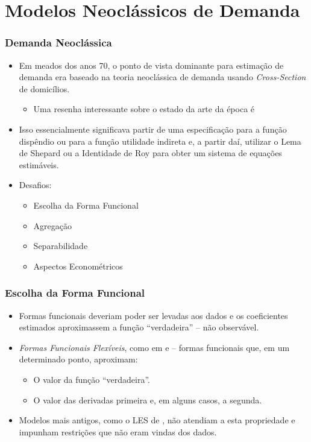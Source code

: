 \documentclass{beamer}
\begin{document}
\section{Modelos Neoclássicos de Demanda}

\begin{frame}[fragile]\frametitle{Demanda Neoclássica}
\begin{itemize}
	\item Em meados dos anos 70, o ponto de vista dominante para estimação de demanda era baseado na teoria neoclássica de demanda usando \textit{Cross-Section} de domicílios.
	\begin{itemize}
		\item Uma resenha interessante sobre o estado da arte da época é \citet{Deaton1986a}
	\end{itemize}
	\item Isso essencialmente significava partir de uma especificação para a função dispêndio ou para a função utilidade indireta e, a partir daí, utilizar o Lema de Shepard ou a Identidade de Roy para obter um sistema de equações estimáveis.
	\item Desafios:
	\begin{itemize}
		\item Escolha da Forma Funcional
		\item Agregação
		\item Separabilidade
		\item Aspectos Econométricos
	\end{itemize}
\end{itemize}
   
\end{frame}

\begin{frame}[fragile]\frametitle{Escolha da Forma Funcional}
\begin{itemize}
	\item Formas funcionais deveriam poder ser levadas aos dados e os coeficientes estimados aproximassem a função ``verdadeira'' -- não observável.
	\item \textit{Formas Funcionais Flexíveis}, como em \citet{BarnettEL83} e \citet{ChristensenTLUtil75} -- formas funcionais que, em um determinado ponto, aproximam:
	\begin{itemize}[<+->]
		\item O valor da função ``verdadeira''.
		\item O valor das derivadas primeira e, em alguns casos, a segunda.
	\end{itemize}
	\item Modelos mais antigos, como o LES de \citet{Klein1947}, não atendiam a esta propriedade e impunham restrições que não eram vindas dos dados.
\end{itemize}
    


\end{frame}
\end{document}
